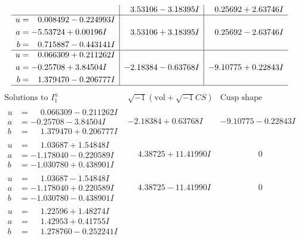 \documentclass[1p]{elsarticle_modified}
\theoremstyle{definition}
\newcommand{\I}{\sqrt{-1}}
\begin{document}
$$\begin{array}{c|c|c}
 & \phantom{-}3.53106 - 3.18395 I & \phantom{-}0.25692 + 2.63746 I \\ \hline\begin{aligned}
u &= \phantom{-}0.008492 - 0.224993 I \\
a &= -5.53724 + 0.00196 I \\
b &= \phantom{-}0.715887 - 0.443141 I\end{aligned}
 & \phantom{-}3.53106 + 3.18395 I & \phantom{-}0.25692 - 2.63746 I \\ \hline\begin{aligned}
u &= \phantom{-}0.066309 + 0.211262 I \\
a &= -0.25708 + 3.84504 I \\
b &= \phantom{-}1.379470 - 0.206777 I\end{aligned}
 & -2.18384 - 0.63768 I & -9.10775 + 0.22843 I\\
 \hline 
 \end{array}$$\newpage$$\begin{array}{c|c|c}  
\text{Solutions to }I^u_{1}& \I (\text{vol} + \sqrt{-1}CS) & \text{Cusp shape}\\
 \hline 
\begin{aligned}
u &= \phantom{-}0.066309 - 0.211262 I \\
a &= -0.25708 - 3.84504 I \\
b &= \phantom{-}1.379470 + 0.206777 I\end{aligned}
 & -2.18384 + 0.63768 I & -9.10775 - 0.22843 I \\ \hline\begin{aligned}
u &= \phantom{-}1.03687 + 1.54848 I \\
a &= -1.178040 - 0.220589 I \\
b &= -1.030780 + 0.438901 I\end{aligned}
 & \phantom{-}4.38725 + 11.41990 I & \phantom{-0.000000 } 0 \\ \hline\begin{aligned}
u &= \phantom{-}1.03687 - 1.54848 I \\
a &= -1.178040 + 0.220589 I \\
b &= -1.030780 - 0.438901 I\end{aligned}
 & \phantom{-}4.38725 - 11.41990 I & \phantom{-0.000000 } 0 \\ \hline\begin{aligned}
u &= \phantom{-}1.22596 + 1.48274 I \\
a &= \phantom{-}1.42953 + 0.41755 I \\
b &= \phantom{-}1.278760 - 0.252241 I\end{aligned}

\end{array}$$
\end{document}

